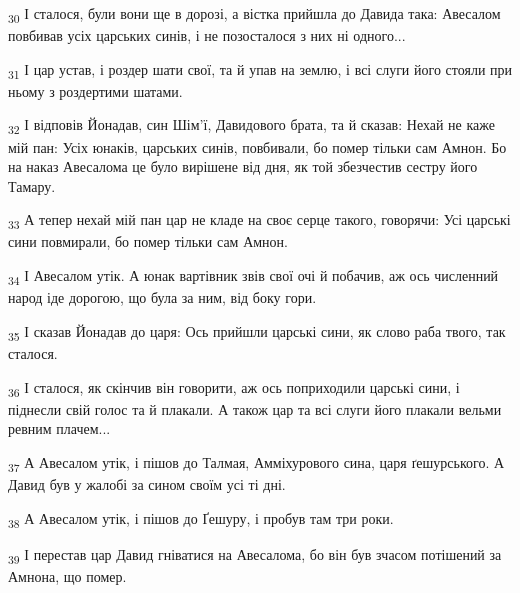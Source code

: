 \begin{tcolorbox}
\textsubscript{30} І сталося, були вони ще в дорозі, а вістка прийшла до Давида така: Авесалом повбивав усіх царських синів, і не позосталося з них ні одного...
\end{tcolorbox}
\begin{tcolorbox}
\textsubscript{31} І цар устав, і роздер шати свої, та й упав на землю, і всі слуги його стояли при ньому з роздертими шатами.
\end{tcolorbox}
\begin{tcolorbox}
\textsubscript{32} І відповів Йонадав, син Шім'ї, Давидового брата, та й сказав: Нехай не каже мій пан: Усіх юнаків, царських синів, повбивали, бо помер тільки сам Амнон. Бо на наказ Авесалома це було вирішене від дня, як той збезчестив сестру його Тамару.
\end{tcolorbox}
\begin{tcolorbox}
\textsubscript{33} А тепер нехай мій пан цар не кладе на своє серце такого, говорячи: Усі царські сини повмирали, бо помер тільки сам Амнон.
\end{tcolorbox}
\begin{tcolorbox}
\textsubscript{34} І Авесалом утік. А юнак вартівник звів свої очі й побачив, аж ось численний народ іде дорогою, що була за ним, від боку гори.
\end{tcolorbox}
\begin{tcolorbox}
\textsubscript{35} І сказав Йонадав до царя: Ось прийшли царські сини, як слово раба твого, так сталося.
\end{tcolorbox}
\begin{tcolorbox}
\textsubscript{36} І сталося, як скінчив він говорити, аж ось поприходили царські сини, і піднесли свій голос та й плакали. А також цар та всі слуги його плакали вельми ревним плачем...
\end{tcolorbox}
\begin{tcolorbox}
\textsubscript{37} А Авесалом утік, і пішов до Талмая, Амміхурового сина, царя ґешурського. А Давид був у жалобі за сином своїм усі ті дні.
\end{tcolorbox}
\begin{tcolorbox}
\textsubscript{38} А Авесалом утік, і пішов до Ґешуру, і пробув там три роки.
\end{tcolorbox}
\begin{tcolorbox}
\textsubscript{39} І перестав цар Давид гніватися на Авесалома, бо він був зчасом потішений за Амнона, що помер.
\end{tcolorbox}
